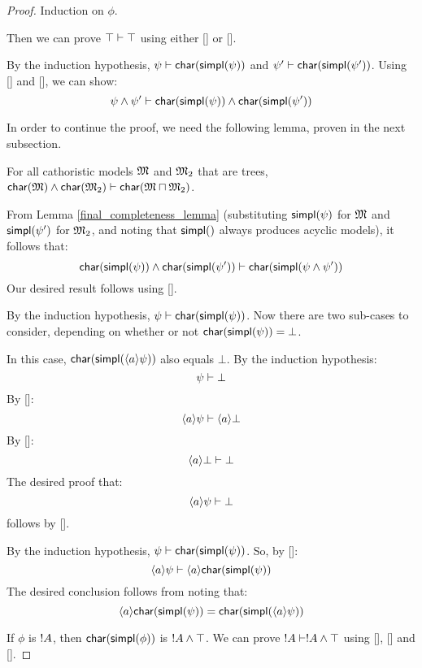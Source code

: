 \begin{proof}
Induction on $\phi$.


 Then we can prove $\top \vdash \top$ using
either [] or [].

 By the induction hypothesis,
$\psi \vdash \mathsf{char}(\mathsf{simpl}(\psi))$ and $\psi' \vdash
\mathsf{char}(\mathsf{simpl}(\psi'))$.  Using [] and [], we can show:
\[
\psi \land \psi' \vdash  \mathsf{char}(\mathsf{simpl}(\psi)) \land  \mathsf{char}(\mathsf{simpl}(\psi'))
\]


In order to continue the proof, we need the following lemma, proven
in the next subsection.

\begin{lemma}
\label{final_completeness_lemma}
For all cathoristic  models $\frak{M}$ and $\frak{M}_2$ that are trees, $ \mathsf{char}(\frak{M}) \land
\mathsf{char}(\frak{M}_2) \vdash \mathsf{char}(\frak{M} \sqcap \frak{M}_2)$.
\end{lemma}

\NI From Lemma \ref{final_completeness_lemma} (substituting $\mathsf{simpl}(\psi)$ for $\frak{M}$ and $\mathsf{simpl}(\psi')$ for $\frak{M}_2$, and noting that $\mathsf{simpl}()$ always produces acyclic models), it follows that:
\[
 \mathsf{char}(\mathsf{simpl}(\psi)) \land  \mathsf{char}(\mathsf{simpl}(\psi')) \vdash  \mathsf{char}(\mathsf{simpl}(\psi \land \psi'))
\]
Our desired result follows using [].

 By the induction
hypothesis, $\psi \vdash \mathsf{char}(\mathsf{simpl}(\psi))$.  Now there are two
sub-cases to consider, depending on whether or not $
\CHAR{\SIMPL{\psi}} = \bot$.  

\SUBCASE{$ \CHAR{\SIMPL{\psi}} = \bot$} In this case, $
\mathsf{char}(\mathsf{simpl}(\langle a \rangle \psi))$ also equals $\bot$.  By the
induction hypothesis:
\[
\psi \vdash \bot
\]
By []:
\[
\langle a \rangle \psi \vdash \langle a \rangle \bot
\]
By []:
\[
\langle a \rangle \bot \vdash \bot
\]
The desired proof that:
\[
\langle a \rangle \psi \vdash \bot
\]
follows by [].

\SUBCASE{$ \CHAR{\SIMPL{\psi}} \neq \bot$}
By the induction hypothesis, $\psi \vdash  \mathsf{char}(\mathsf{simpl}(\psi))$.
So, by []:
\[
\langle a \rangle \psi \vdash \langle a \rangle  \mathsf{char}(\mathsf{simpl}(\psi))
\]
The desired conclusion follows from noting that:
\[
 \langle a \rangle  \mathsf{char}(\mathsf{simpl}(\psi)) =  \mathsf{char}(\mathsf{simpl}(\langle a \rangle \psi))
 \]

  If $\phi$ is $! A$, then $
 \mathsf{char}(\mathsf{simpl}(\phi))$ is $! A \land \top$.  We can prove $! A
 \vdash ! A \land \top$ using [], [] and [].
\end{proof}

